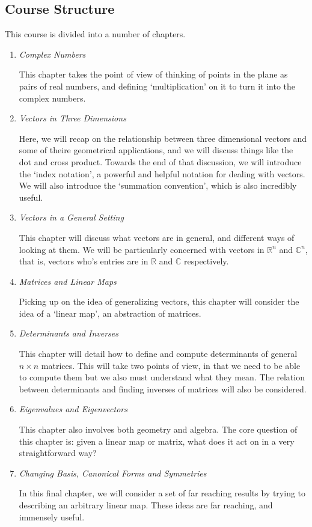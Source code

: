 \documentclass[a4]{scrartcl}
\begin{document}
\subsection{Course Structure}

This course is divided into a number of chapters.

\begin{enumerate}
	\item \emph{Complex Numbers}

	This chapter takes the point of view of thinking of points in the plane as pairs of real numbers, and defining `multiplication' on it to turn it into the complex numbers.

	\item \emph{Vectors in Three Dimensions}
	
	Here, we will recap on the relationship between three dimensional vectors and some of theire geometrical applications, and we will discuss things like the dot and cross product. Towards the end of that discussion, we will introduce the `index notation', a powerful and helpful notation for dealing with vectors. We will also introduce the `summation convention', which is also incredibly useful.

	\item \emph{Vectors in a General Setting}
	
	This chapter will discuss what vectors are in general, and different ways of looking at them. We will be particularly concerned with vectors in $\mathbb{R}^n$ and $\mathbb{C}^n$, that is, vectors who's entries are in $\mathbb{R}$ and $\mathbb{C}$ respectively.

	\item \emph{Matrices and Linear Maps}
	
	Picking up on the idea of generalizing vectors, this chapter will consider the idea of a `linear map', an abstraction of matrices. 

	\item \emph{Determinants and Inverses}
	
	This chapter will detail how to define and compute determinants of general $n \times n$ matrices. This will take two points of view, in that we need to be able to compute them but we also must understand what they mean. The relation between determinants and finding inverses of matrices will also be considered.

	\item \emph{Eigenvalues and Eigenvectors}
	
	This chapter also involves both geometry and algebra. The core question of this chapter is: given a linear map or matrix, what does it act on in a very straightforward way?

	\item \emph{Changing Basis, Canonical Forms and Symmetries}
	
	In this final chapter, we will consider a set of far reaching results by trying to describing an arbitrary linear map. These ideas are far reaching, and immensely useful.
\end{enumerate}
\end{document}
